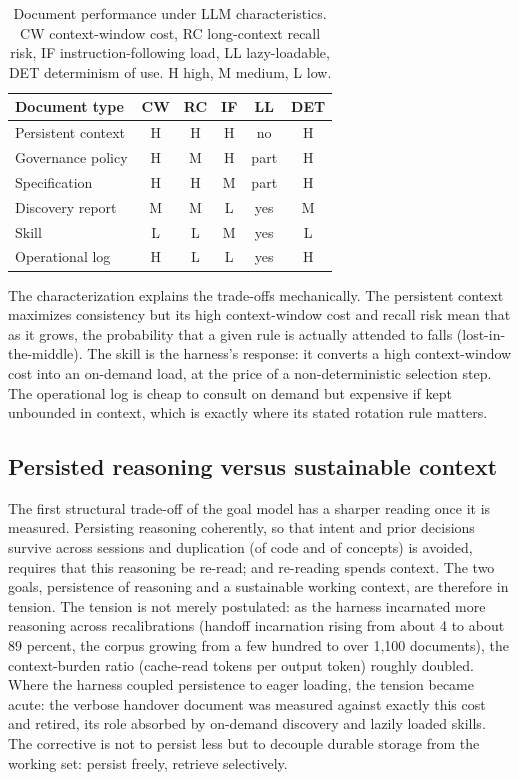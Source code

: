 \documentclass[sigconf]{acmart}
\begin{document}
\begin{table}[t]
\caption{Document performance under LLM characteristics. CW context-window cost, RC long-context recall risk, IF instruction-following load, LL lazy-loadable, DET determinism of use. H high, M medium, L low.}
\label{tab:llm}
\scriptsize
\begin{tabularx}{\columnwidth}{@{}Xccccc@{}}
\toprule
Document type & CW & RC & IF & LL & DET \\
\midrule
Persistent context & H & H & H & no & H \\
Governance policy & H & M & H & part & H \\
Specification & H & H & M & part & H \\
Discovery report & M & M & L & yes & M \\
Skill & L & L & M & yes & L \\
Operational log & H & L & L & yes & H \\
\bottomrule
\end{tabularx}
\end{table}

The characterization explains the trade-offs mechanically. The persistent context maximizes consistency but its high context-window cost and recall risk mean that as it grows, the probability that a given rule is actually attended to falls (lost-in-the-middle). The skill is the harness's response: it converts a high context-window cost into an on-demand load, at the price of a non-deterministic selection step. The operational log is cheap to consult on demand but expensive if kept unbounded in context, which is exactly where its stated rotation rule matters.

\subsection{Persisted reasoning versus sustainable context}
The first structural trade-off of the goal model has a sharper reading once it is measured. Persisting reasoning coherently, so that intent and prior decisions survive across sessions and duplication (of code and of concepts) is avoided, requires that this reasoning be re-read; and re-reading spends context. The two goals, persistence of reasoning and a sustainable working context, are therefore in tension. The tension is not merely postulated: as the harness incarnated more reasoning across recalibrations (handoff incarnation rising from about 4 to about 89 percent, the corpus growing from a few hundred to over 1,100 documents), the context-burden ratio (cache-read tokens per output token) roughly doubled. Where the harness coupled persistence to eager loading, the tension became acute: the verbose handover document was measured against exactly this cost and retired, its role absorbed by on-demand discovery and lazily loaded skills. The corrective is not to persist less but to decouple durable storage from the working set: persist freely, retrieve selectively.
\end{document}
